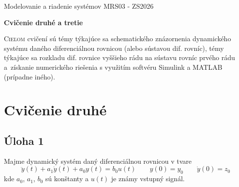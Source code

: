 \documentclass[a4paper, 10pt, ]{article}
\def\oznacenieCasti{MRS03 - ZS2026}
\begin{document}
\lstset{%
style=mystyle,
rangebeginprefix=\#\#\#\ cellB\ ,%
rangebeginsuffix=\ \#\#\#,%
rangeendprefix=\#\#\#\ cellE\ ,%
rangeendsuffix=\ \#\#\#,%
includerangemarker=false,
}






\fontsize{12pt}{22pt}\selectfont

\centerline{\textsf{Modelovanie a riadenie systémov} \hfill \textsf{\oznacenieCasti}}

\fontsize{18pt}{22pt}\selectfont





\begin{flushleft}
	\textbf{\textsf{Cvičenie druhé a tretie}}
\end{flushleft}






\normalsize

\bigskip

{\hypersetup{hidelinks}

\tableofcontents

}

\bigskip

\vspace{18pt}



\noindent
\lettrine[lines=3, nindent=0pt]{C}{ieľom} cvičení sú témy týkajúce sa schematického znázornenia dynamického systému daného diferenciálnou rovnicou (alebo sústavou dif. rovníc), témy týkajúce sa rozkladu dif. rovnice vyššieho rádu na sústavu rovníc prvého rádu a~získanie numerického riešenia s využitím softvéru Simulink a MATLAB (prípadne iného).














\section{Cvičenie druhé} 




\subsection{Úloha 1} \label{cv2u1}

Majme dynamický systém daný diferenciálnou rovnicou v tvare
\begin{equation} \label{eq:DR2R}
    \ddot y(t) + a_1 \dot y(t) + a_0 y(t) = b_0 u(t) \qquad y(0) = y_0 \qquad \dot y(0) = z_0
\end{equation}
kde $a_0$, $a_1$, $b_0$ sú konštanty a $u(t)$ je známy vstupný signál.
\end{document}
